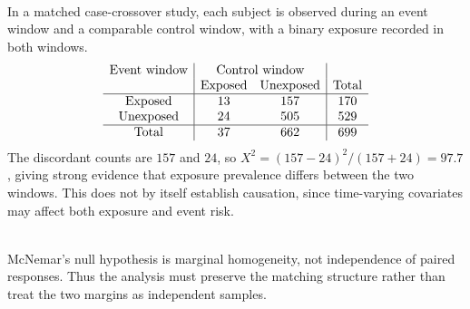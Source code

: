 \begin{example} \label{ex:matched-case-crossover-binary-exposure} \\
In a matched case-crossover study, each subject is observed during an event window and a comparable control window, with a binary exposure recorded in both windows.
\[
\begin{array}{c|cc|c}
\text{Event window}&\multicolumn{2}{c|}{\text{Control window}}&\\
&\text{Exposed}&\text{Unexposed}&\text{Total}\\ \hline
\text{Exposed}&13&157&170\\
\text{Unexposed}&24&505&529\\ \hline
\text{Total}&37&662&699
\end{array}
\]
The discordant counts are $157$ and $24$, so $X^2=(157-24)^2/(157+24)=97.7$, giving strong evidence that exposure prevalence differs between the two windows. This does not by itself establish causation, since time-varying covariates may affect both exposure and event risk.
\end{example}

\begin{remark} \label{rem:mcnemar-versus-independence} \\
McNemar's null hypothesis is marginal homogeneity, not independence of paired responses. Thus the analysis must preserve the matching structure rather than treat the two margins as independent samples.
\end{remark}
